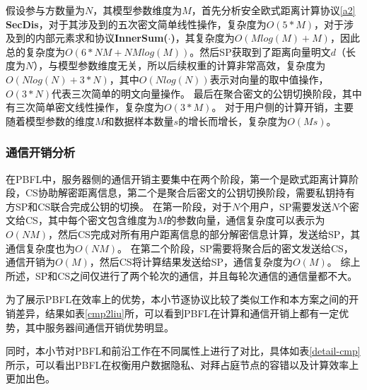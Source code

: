 假设参与方数量为$N$，其模型参数维度为$M$，首先分析安全欧式距离计算协议\ref{a2} \textbf{SecDis}，对于其涉及到的五次密文简单线性操作，复杂度为$O(5*M)$，对于涉及到的内部元素求和协议\textbf{InnerSum($\cdot$)}，其复杂度为$O(Mlog(M) + M)$，因此总的复杂度为$O(6*NM+NMlog(M))$。然后SP获取到了距离向量明文$d$（长度为$N$），与模型参数维度无关，所以后续权重的计算非常高效，复杂度为$O(Nlog(N) + 3*N)$，其中$O(Nlog(N))$表示对向量的取中值操作，$O(3*N)$代表三次简单的明文向量操作。
最后在聚合密文的公钥切换阶段，其中有三次简单密文线性操作，复杂度为$ O(3*M) $。
对于用户侧的计算开销，主要随着模型参数的维度$M$和数据样本数量$s$的增长而增长，复杂度为$O(Ms)$。

\subsubsection{通信开销分析}
在PBFL中，服务器侧的通信开销主要集中在两个阶段，第一个是欧式距离计算阶段，CS协助解密距离信息，第二个是聚合后密文的公钥切换阶段，需要私钥持有方SP和CS联合完成公钥的切换。
在第一阶段，对于$N$个用户，SP需要发送$N$个密文给CS，其中每个密文包含维度为$M$的参数向量，通信复杂度可以表示为$O(NM)$，然后CS完成对所有用户距离信息的部分解密信息计算，发送给SP，其通信复杂度也为$O(NM)$。
在第二个阶段，SP需要将聚合后的密文发送给CS，通信开销为$O(M)$，然后CS将计算结果发送给SP，通信复杂度为$O(M)$。
综上所述，SP和CS之间仅进行了两个轮次的通信，并且每轮次通信的通信量都不大。

为了展示PBFL在效率上的优势，本小节逐协议比较了类似工作\cite{liu2021privacy}和本方案之间的开销差异，结果如表\ref{cmp2liu}所，可以看到PBFL在计算和通信开销上都有一定优势，其中服务器间通信开销优势明显。

同时，本小节对PBFL和前沿工作在不同属性上进行了对比，具体如表\ref{detail-cmp}所示，可以看出PBFL在权衡用户数据隐私、对拜占庭节点的容错以及计算效率上更加出色。

